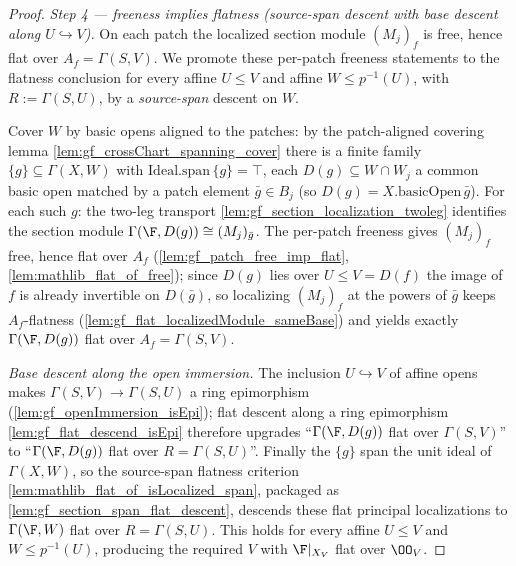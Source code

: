 \begin{proof}
  \emph{Step 4 — freeness implies flatness (source-span descent with base descent along
  \(U \hookrightarrow V\)).} On each patch the localized section module \((M_j)_f\) is free,
  hence flat over \(A_f = \Gamma(S, V)\). We promote these per-patch freeness statements to
  the flatness conclusion for every affine \(U \le V\) and affine \(W \le p^{-1}(U)\), with
  \(R := \Gamma(S, U)\), by a \emph{source-span} descent on \(W\).

  Cover \(W\) by basic opens aligned to the patches: by the patch-aligned covering lemma
  \cref{lem:gf_crossChart_spanning_cover} there is a finite family
  \(\{g\} \subseteq \Gamma(X, W)\) with \(\mathrm{Ideal.span}\,\{g\} = \top\), each
  \(D(g) \subseteq W \cap W_{j}\) a common basic open matched by a patch element
  \(\bar g \in B_{j}\) (so \(D(g) = X.\mathrm{basicOpen}\,\bar g\)). For each such \(g\): the
  two-leg transport \cref{lem:gf_section_localization_twoleg} identifies the section module
  \(\Gamma(\F, D(g)) \cong (M_{j})_{\bar g}\). The per-patch freeness gives \((M_{j})_f\)
  free, hence flat over \(A_f\) (\cref{lem:gf_patch_free_imp_flat},
  \cref{lem:mathlib_flat_of_free}); since \(D(g)\) lies over \(U \le V = D(f)\) the image of
  \(f\) is already invertible on \(D(\bar g)\), so localizing \((M_{j})_f\) at the
  powers of \(\bar g\) keeps \(A_f\)-flatness
  (\cref{lem:gf_flat_localizedModule_sameBase}) and yields exactly \(\Gamma(\F, D(g))\) flat
  over \(A_f = \Gamma(S, V)\).

  \emph{Base descent along the open immersion.} The inclusion \(U \hookrightarrow V\) of
  affine opens makes \(\Gamma(S, V) \to \Gamma(S, U)\) a ring epimorphism
  (\cref{lem:gf_openImmersion_isEpi}); flat descent along a ring epimorphism
  \cref{lem:gf_flat_descend_isEpi} therefore upgrades ``\(\Gamma(\F, D(g))\) flat over
  \(\Gamma(S, V)\)'' to ``\(\Gamma(\F, D(g))\) flat over \(R = \Gamma(S, U)\)''. Finally the
  \(\{g\}\) span the unit ideal of \(\Gamma(X, W)\), so the source-span flatness criterion
  \cref{lem:mathlib_flat_of_isLocalized_span}, packaged as
  \cref{lem:gf_section_span_flat_descent}, descends these flat principal localizations to
  \(\Gamma(\F, W)\) flat over \(R = \Gamma(S, U)\). This holds for every affine \(U \le V\)
  and \(W \le p^{-1}(U)\), producing the required \(V\) with \(\F|_{X_V}\) flat over
  \(\OO_V\).
\end{proof}
